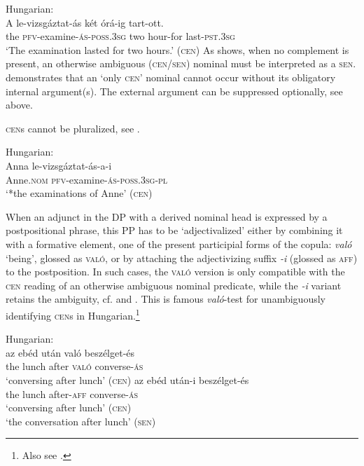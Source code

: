 \documentclass[output=paper,hidelinks]{langscibook}
\begin{document}
\ea%
    \label{ex:FinnoUgric:84}Hungarian:\\
    \gll *A le-vizsgáztat-ás két órá-ig tart-ott.\\
        the \textsc{pfv}{}-examine-\textsc{ás-poss.3sg} two hour-for last-\textsc{pst.3sg}\\
    \glt `The examination lasted for two hours.' (\textsc{cen})
    \z
As  shows, when no complement is present, an otherwise ambiguous (\textsc{cen{\slash}sen}) nominal must be interpreted as a \textsc{sen}.  demonstrates that an `only \textsc{cen}' nominal cannot occur without its obligatory internal argument(s). The external argument can be suppressed optionally, see  above.



\textsc{cen}s cannot be pluralized, see .



\ea%
    \label{ex:FinnoUgric:85}Hungarian:\\
    \gll *Anna le-vizsgáztat\nobreakdash-ás\nobreakdash-a-i\\
        Anne.\textsc{nom} \textsc{pfv}{}-examine\nobreakdash-\textsc{ás\nobreakdash-poss.3sg-pl}\\
    \glt `*the examinations of Anne' (\textsc{cen})
    \z

When an adjunct in the DP with a derived nominal head is expressed by a postpositional phrase, this PP has to be `adjectivalized' either by combining it with a formative element, one of the present participial forms of the copula: \textit{való} `being', glossed as \textsc{való}, or by attaching the adjectivizing suffix \textit{{}-i} (glossed as \textsc{aff}) to the postposition. In such cases, the \textsc{való} version is only compatible with the \textsc{cen} reading of an otherwise ambiguous nominal predicate, while the \textit{{}-i} variant retains the ambiguity, cf.  and . This is  famous \textit{való}{}-test for unambiguously identifying \textsc{cen}s in Hungarian.\footnote{Also see \citet{LaczkoRakosi2007}.}



\ea%
    \label{ex:FinnoUgric:86}Hungarian:\\
\ea\label{ex:FinnoUgric:86a}
    \gll az ebéd után való beszélget-és\\
        the lunch after \textsc{való} converse-\textsc{ás}\\
        \glt `conversing after lunch' (\textsc{cen})
\ex\label{ex:FinnoUgric:86b}
\gll  az ebéd után-i beszélget-és\\
the lunch after-\textsc{aff} converse-\textsc{ás}\\
\glt `conversing after lunch' (\textsc{cen})\\
    `the conversation after lunch' (\textsc{sen})
    \z\z
\end{document}
